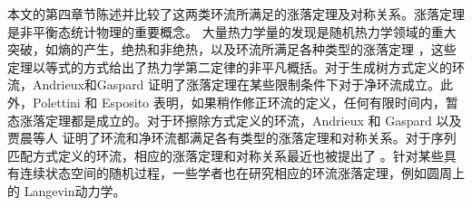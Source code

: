 本文的第四章节陈述并比较了这两类环流所满足的涨落定理及对称关系。涨落定理是非平衡态统计物理的重要概念。
大量热力学量的发现是随机热力学领域的重大突破，如熵的产生，绝热和非绝热，以及环流所满足各种类型的涨落定理 \cite{annurev-conmatphys,Seifert_2012,VANDENBROECK20156}，这些定理以等式的方式给出了热力学第二定律的非平凡概括。对于生成树方式定义的环流，Andrieux和Gaspard \cite{andrieux2007fluctuation}证明了涨落定理在某些限制条件下对于净环流成立。此外，Polettini 和 Esposito \cite{polettini2014transient}表明，如果稍作修正环流的定义，任何有限时间内，暂态涨落定理都是成立的。对于环擦除方式定义的环流，Andrieux 和 Gaspard \cite{andrieux2007network}以及贾晨等人 \cite{jia2016cycle} 证明了环流和净环流都满足各有类型的涨落定理和对称关系。对于序列匹配方式定义的环流，相应的涨落定理和对称关系最近也被提出了 \cite{pietzonka2021cycle}。针对某些具有连续状态空间的随机过程，一些学者也在研究相应的环流涨落定理，例如圆周上的 Langevin动力学\cite{ge2017cycle}。

